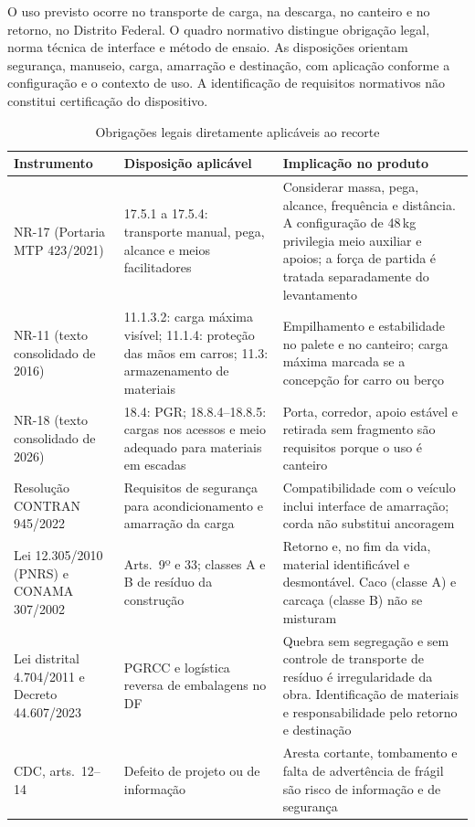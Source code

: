 O uso previsto ocorre no transporte de carga, na descarga, no canteiro e no retorno, no Distrito Federal. O quadro normativo distingue obrigação legal, norma técnica de interface e método de ensaio. As disposições orientam segurança, manuseio, carga, amarração e destinação, com aplicação conforme a configuração e o contexto de uso. A identificação de requisitos normativos não constitui certificação do dispositivo.

\begin{table}[H]
\caption{Obrigações legais diretamente aplicáveis ao recorte}
\label{tab:normas-legais}
\centering
\scriptsize
\begin{tabularx}{\textwidth}{@{}L{3.3cm}@{\hspace{0.25cm}}L{3.4cm}@{\hspace{0.25cm}}Y@{}}
\toprule
\textbf{Instrumento} & \textbf{Disposição aplicável} & \textbf{Implicação no produto} \\
\midrule
NR-17 (Portaria MTP 423/2021) & 17.5.1 a 17.5.4: transporte manual, pega, alcance e meios facilitadores & Considerar massa, pega, alcance, frequência e distância. A configuração de 48\,kg privilegia meio auxiliar e apoios; a força de partida é tratada separadamente do levantamento \\
NR-11 (texto consolidado de 2016) & 11.1.3.2: carga máxima visível; 11.1.4: proteção das mãos em carros; 11.3: armazenamento de materiais & Empilhamento e estabilidade no palete e no canteiro; carga máxima marcada se a concepção for carro ou berço \\
NR-18 (texto consolidado de 2026) & 18.4: PGR; 18.8.4--18.8.5: cargas nos acessos e meio adequado para materiais em escadas & Porta, corredor, apoio estável e retirada sem fragmento são requisitos porque o uso é canteiro \\
Resolução CONTRAN 945/2022 & Requisitos de segurança para acondicionamento e amarração da carga & Compatibilidade com o veículo inclui interface de amarração; corda não substitui ancoragem \\
Lei 12.305/2010 (PNRS) e CONAMA 307/2002 & Arts.\ 9º e 33; classes A e B de resíduo da construção & Retorno e, no fim da vida, material identificável e desmontável. Caco (classe A) e carcaça (classe B) não se misturam \\
Lei distrital 4.704/2011 e Decreto 44.607/2023 & PGRCC e logística reversa de embalagens no DF & Quebra sem segregação e sem controle de transporte de resíduo é irregularidade da obra. Identificação de materiais e responsabilidade pelo retorno e destinação \\
CDC, arts.\ 12--14 & Defeito de projeto ou de informação & Aresta cortante, tombamento e falta de advertência de frágil são risco de informação e de segurança \\
\bottomrule
\end{tabularx}
\end{table}

